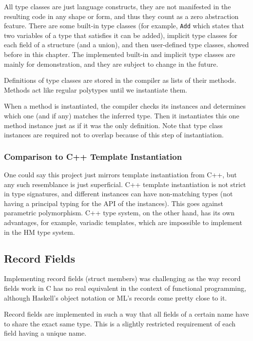 All type classes are just language constructs, they are not manifested in the resulting code in any shape or form, and thus they count as a zero abstraction feature. There are some built-in type classes (for example, \lstinline{Add} which states that two variables of a type that satisfies it can be added), implicit type classes for each field of a structure (and a union), and then user-defined type classes, showed before in this chapter. The implemented built-in and implicit type classes are mainly for demonstration, and they are subject to change in the future.

Definitions of type classes are stored in the compiler as lists of their methods. Methods act like regular polytypes until we instantiate them.

When a method is instantiated, the compiler checks its instances and determines which one (and if any) matches the inferred type. Then it instantiates this one method instance just as if it was the only definition. Note that type class instances are required not to overlap because of this step of instantiation.


\subsubsection{Comparison to C++ Template Instantiation}

One could say this project just mirrors template instantiation from C++, but any such resemblance is just superficial. C++ template instantiation is not strict in type signatures, and different instances can have non-matching types (not having a principal typing for the API of the instances). This goes against parametric polymorphism. C++ type system, on the other hand, has its own advantages, for example, variadic templates, which are impossible to implement in the HM type system.

\subsection{Record Fields}
\label{ssec:recordFieldsCHM}

Implementing record fields (struct members) was challenging as the way record fields work in C has no real equivalent in the context of functional programming, although Haskell's object notation or ML's records come pretty close to it.

Record fields are implemented in such a way that all fields of a certain name have to share the exact same type. This is a slightly restricted requirement of each field having a unique name.

